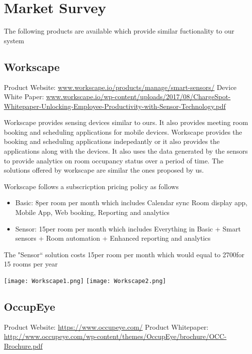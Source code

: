 \chapter{Market Survey}
The following products are available which provide similar fuctionality to our system

\section{Workscape}


Product Website: \url{www.workscape.io/products/manage/smart-sensors/}
\newline
Device White Paper: \url{www.workscape.io/wp-content/uploads/2017/08/ChargeSpot-Whitepaper-Unlocking-Employee-Productivity-with-Sensor-Technology.pdf}


Workscape provides sensing devices similar to ours. It also provides meeting room booking and scheduling applications for mobile devices.
Workscape provides the booking and scheduling applications indepedantly or it also provides the applications along with the devices.
It also uses the data generated by the sensors to provide analytics on room occupancy status over a period of time.
The solutions offered by workscape are similar the ones proposed by us.

Workscape follows a subscricption pricing policy as follows
\begin{itemize}
\item Basic: 8\textdollar per room per month which includes Calendar sync Room display app, Mobile App, Web booking, Reporting and analytics
\item Sensor: 15\textdollar per room per month which includes Everything in Basic + Smart sensors + Room automation + Enhanced reporting and analytics
\end{itemize}

The "Sensor`` solution costs 15\textdollar per room per month which would equal to 2700\textdollar for 15 rooms per year


\texttt{[image: Workscape1.png]}
\texttt{[image: Workscape2.png]}

\section{OccupEye}

Product Website: \url{https://www.occupeye.com/}
\newline
Product Whitepaper: \url{http://www.occupeye.com/wp-content/themes/OccupEye/brochure/OCC-Brochure.pdf}

